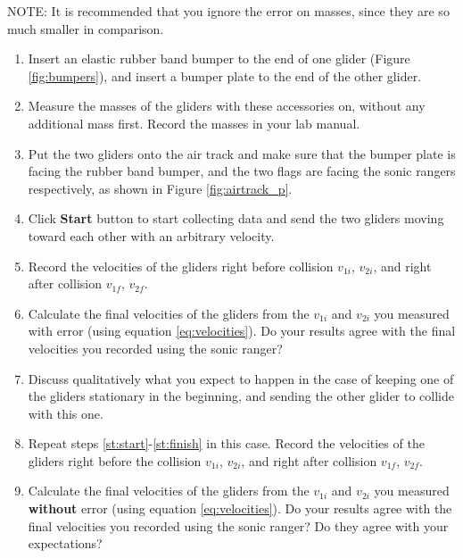 NOTE:  It is recommended that you ignore the error on masses, since they are so much smaller in comparison.

\begin{enumerate}
\item Insert an elastic rubber band bumper to the end of one glider (Figure \ref{fig:bumpers}), and insert a bumper plate to the end of the other glider.
\item Measure the masses of the gliders with these accessories on, without any additional mass first. Record the masses in your lab manual.
\item Put the two gliders onto the air track and make sure that the bumper plate is facing the rubber band bumper, and the two flags are facing the sonic rangers respectively, as shown in Figure \ref{fig:airtrack_p}.\label{st:start}
\item Click \textbf{Start} button to start collecting data and send the two gliders moving toward each other with an arbitrary velocity.
\item Record the velocities of the gliders right before collision $v_{1i}$, $v_{2i}$, and right after collision $v_{1f}$, $v_{2f}$.
\item Calculate the final velocities of the gliders from the $v_{1i}$ and $v_{2i}$ you measured with error (using equation \ref{eq:velocities}). Do your results agree with the final velocities you recorded using the sonic ranger?  \label{st:finish}

  \item Discuss qualitatively what you expect to happen in the case of keeping one of the gliders stationary in the beginning, and sending the other glider to collide with this one.
  \item Repeat steps \ref{st:start}-\ref{st:finish} in this case. Record the velocities of the gliders right before the collision $v_{1i}$, $v_{2i}$, and right after collision $v_{1f}$, $v_{2f}$.
  \item Calculate the final velocities of the gliders from the $v_{1i}$ and $v_{2i}$ you measured \textbf{without} error (using equation \ref{eq:velocities}). Do your results agree with the final velocities you recorded using the sonic ranger? Do they agree with your expectations?


\end{enumerate}
